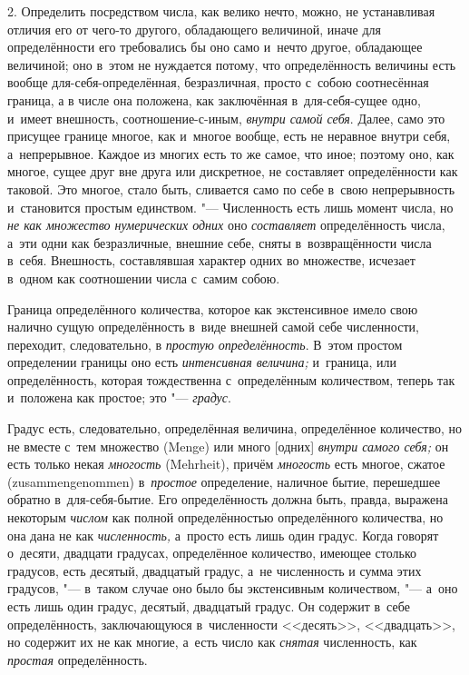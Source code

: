 2. Определить посредством числа, как велико нечто, можно, не устанавливая
отличия его от чего-то другого, обладающего величиной, иначе для определённости
его требовались бы оно само и~нечто другое, обладающее величиной; оно в~этом не
нуждается потому, что определённость величины есть вообще
для-себя-определённая, безразличная, просто с~собою соотнесённая граница, а
в числе она положена, как заключённая в~для-себя-сущее одно, и~имеет внешность,
соотношение-с-иным, {\em внутри самой себя}. Далее, само это присущее границе
многое, как и~многое вообще, есть не неравное внутри себя, а~непрерывное.
Каждое из многих есть то же самое, что иное; поэтому оно, как многое, сущее
друг вне друга или дискретное, не составляет определённости как таковой. Это
многое, стало быть, сливается само по себе в~свою непрерывность и~становится
простым единством. "--- Численность есть лишь момент числа, но {\em не как
множество нумерических одних} оно {\em составляет} определённость числа, а~эти
одни как безразличные, внешние себе, сняты в~возвращённости числа в~себя.
Внешность, составлявшая характер одних во множестве, исчезает в~одном как
соотношении числа с~самим собою.

Граница определённого количества, которое как экстенсивное имело свою налично
сущую определённость в~виде внешней самой себе численности, переходит,
следовательно, в {\em простую определённость}. В~этом простом определении
границы оно есть {\em интенсивная величина;} и~граница, или определённость,
которая тождественна с~определённым количеством, теперь так и~положена как
простое; это "--- {\em градус}.

Градус есть, следовательно, определённая величина, определённое количество, но
не вместе с~тем множество (Menge) или много [одних] {\em внутри самого себя;}
он есть только некая {\em многость} (Mehrheit), причём {\em многость} есть
многое, сжатое (zusammen\-genommen) в~{\em простое} определение, наличное бытие,
перешедшее обратно в~для-себя-бытие. Его определённость должна быть, правда,
выражена некоторым {\em числом} как полной определённостью определённого
количества, но она дана не как {\em численность,} а~просто есть лишь один
градус. Когда говорят о~десяти, двадцати градусах, определённое количество,
имеющее столько градусов, есть десятый, двадцатый градус, а~не численность и
сумма этих градусов, "--- в~таком случае оно было бы экстенсивным количеством,
"--- а~оно есть лишь один градус, десятый, двадцатый градус. Он содержит в~себе
определённость, заключающуюся в~численности <<десять>>, <<двадцать>>, но
содержит их не как многие, а~есть число как {\em снятая} численность, как
{\em простая} определённость.

